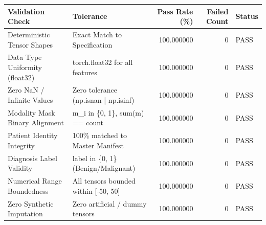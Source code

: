 \begin{tabular}{llrrl}
\toprule
Validation Check & Tolerance & Pass Rate (\%) & Failed Count & Status \\
\midrule
Deterministic Tensor Shapes & Exact Match to Specification & 100.000000 & 0 & PASS \\
Data Type Uniformity (float32) & torch.float32 for all features & 100.000000 & 0 & PASS \\
Zero NaN / Infinite Values & Zero tolerance (np.isnan | np.isinf) & 100.000000 & 0 & PASS \\
Modality Mask Binary Alignment & m\_i in \{0, 1\}, sum(m) == count & 100.000000 & 0 & PASS \\
Patient Identity Integrity & 100\% matched to Master Manifest & 100.000000 & 0 & PASS \\
Diagnosis Label Validity & label in \{0, 1\} (Benign/Malignant) & 100.000000 & 0 & PASS \\
Numerical Range Boundedness & All tensors bounded within [-50, 50] & 100.000000 & 0 & PASS \\
Zero Synthetic Imputation & Zero artificial / dummy tensors & 100.000000 & 0 & PASS \\
\bottomrule
\end{tabular}
